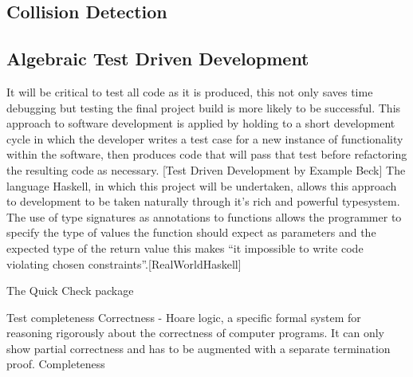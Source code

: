 \documentclass[main.tex]{subfiles}
\begin{document}
\subsection{Collision Detection}

\subsection{Algebraic Test Driven Development}
It will be critical to test all code as it is produced, this not only saves time debugging but testing the final project build is more likely to be successful. This approach to software development is applied by holding to a short development cycle in which the developer writes a test case for a new instance of functionality within the software, then produces code that will pass that test before refactoring the resulting code as necessary. [Test Driven Development by Example Beck] The language Haskell, in which this project will be undertaken, allows this approach to development to be taken naturally through it's rich and powerful typesystem. The use of type signatures as annotations to functions allows the programmer to specify the type of values the function should expect as parameters and the expected type of the return value this makes ``it impossible to write code violating chosen constraints''.[RealWorldHaskell]

The Quick Check package

Test completeness
Correctness - Hoare logic, a specific formal system for reasoning rigorously about the correctness of computer programs. It can only show partial correctness and has to be augmented with a separate termination proof. 
Completeness
\end{document}
